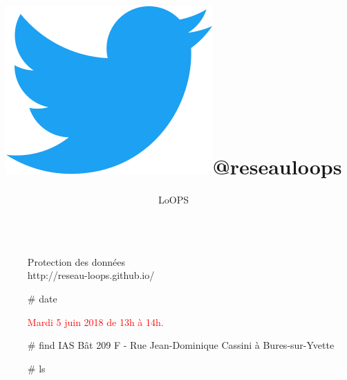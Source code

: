 \documentclass[final]{beamer}
\title{\includegraphics[width=0.05\linewidth]{Twitter_Bird.png}@reseauloops}%
\author{LoOPS} %
\institute{@reseauloops} %
\newlength{\sepwid}
\newlength{\twocolwid}
\begin{document}

\setlength{\belowcaptionskip}{3ex} %
\setlength\belowdisplayshortskip{3ex} %


\begin{frame}[t] %

\begin{columns}[t] %

\begin{column}{\sepwid}\end{column} %

\begin{column}{\twocolwid} %


\begin{alertblock}{\huge{Protection des donn\'{e}es}\\\large{http://reseau-loops.github.io/}}
\end{alertblock}



\begin{block}{\# date}

{\textcolor{red}{
     Mardi 5 juin 2018 de 13h \`{a} 14h.
}}

\end{block}


\begin{block}{\# find}
     IAS B\^{a}t 209 F - Rue Jean-Dominique Cassini \`{a} Bures-sur-Yvette
\end{block}

\begin{block}{\# ls}


\end{block}
\end{column}
\end{columns}
\end{frame}
\end{document}
